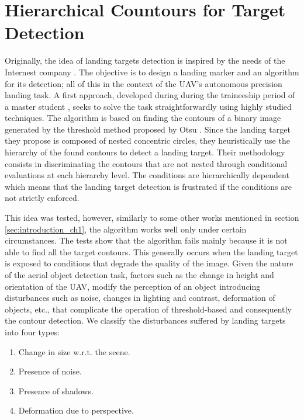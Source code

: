 \section{Hierarchical Countours for Target Detection}\label{sec:hierarchical_target_detection}

Originally, the idea of landing targets detection is inspired by the needs of the Internest company \citep{InternestWeb}. The objective is to design a landing marker and an algorithm for its detection; all of this in the context of the UAV's autonomous precision landing task. 
A first approach, developed during during the traineeship period of a master student \citep{BaquedanoA.:ESIEE:2017}, seeks to solve the task straightforwardly using highly studied techniques. The algorithm is based on finding the contours of a binary image generated by the threshold method proposed by Otsu \citep{Otsu:SMC:1979}. Since the landing target they propose is composed of nested concentric circles, they heuristically use the hierarchy of the found contours to detect a landing target. Their methodology consists in discriminating the contours that are not nested through conditional evaluations at each hierarchy level. The conditions are hierarchically dependent which means that the landing target detection is frustrated if the conditions are not strictly enforced.

This idea was tested, however, similarly to some other works mentioned in section \ref{sec:introduction_ch1}, the algorithm works well only under certain circumstances. The tests show that the algorithm fails mainly because it is not able to find all the target contours. This generally occurs when the landing target is exposed to conditions that degrade the quality of the image. Given the nature of the aerial object detection task, factors such as the change in height and orientation of the UAV, modify the perception of an object introducing disturbances such as noise, changes in lighting and contrast, deformation of objects, etc., that complicate the operation of threshold-based and consequently the contour detection. We classify the disturbances suffered by landing targets into four types: 

\begin{enumerate}
	\item Change in size w.r.t. the scene.
	\item Presence of noise.
	\item Presence of shadows.
	\item Deformation due to perspective.
\end{enumerate}

